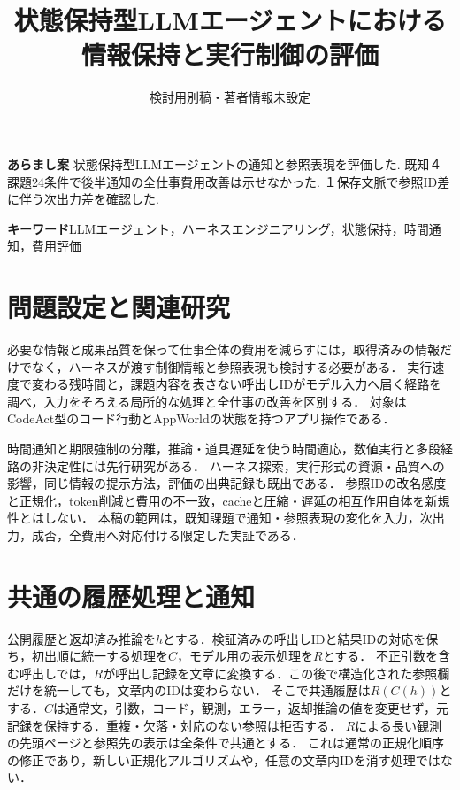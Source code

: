 \documentclass[uplatex,a4paper,twocolumn,10pt]{jsarticle}
\title{状態保持型LLMエージェントにおける\newline 情報保持と実行制御の評価}
\author{検討用別稿・著者情報未設定}
\date{}
\begin{document}
\raggedbottom
\maketitle
\noindent\textbf{あらまし案}\quad
状態保持型LLMエージェントの通知と参照表現を評価した. 既知４課題24条件で後半通知の全仕事費用改善は示せなかった. １保存文脈で参照ID差に伴う次出力差を確認した.

\noindent\textbf{キーワード}\quad LLMエージェント，ハーネスエンジニアリング，状態保持，時間通知，費用評価

\section{問題設定と関連研究}
必要な情報と成果品質を保って仕事全体の費用を減らすには，取得済みの情報だけでなく，ハーネスが渡す制御情報と参照表現も検討する必要がある．
実行速度で変わる残時間と，課題内容を表さない呼出しIDがモデル入力へ届く経路を調べ，入力をそろえる局所的な処理と全仕事の改善を区別する．
対象はCodeAct\cite{codeact}型のコード行動とAppWorld\cite{appworld}の状態を持つアプリ操作である．

時間通知と期限強制の分離\cite{clock}，推論・道具遅延を使う時間適応\cite{timely}，数値実行と多段経路の非決定性\cite{nondeterminism,consistency}には先行研究がある．
ハーネス探索\cite{beyondprompts}，実行形式の資源・品質への影響\cite{localprotocol}，同じ情報の提示方法\cite{delivery}，評価の出典記録\cite{repro}も既出である．
参照IDの改名感度と正規化\cite{canonical}，token削減と費用の不一致\cite{costproxy}，cacheと圧縮・遅延の相互作用\cite{capc,cacheeval}自体を新規性とはしない．
本稿の範囲は，既知課題で通知・参照表現の変化を入力，次出力，成否，全費用へ対応付ける限定した実証である．

\section{共通の履歴処理と通知}
公開履歴と返却済み推論を$h$とする．検証済みの呼出しIDと結果IDの対応を保ち，初出順に統一する処理を$C$，モデル用の表示処理を$R$とする．
不正引数を含む呼出しでは，$R$が呼出し記録を文章に変換する．この後で構造化された参照欄だけを統一しても，文章内のIDは変わらない．
そこで共通履歴は$R(C(h))$とする．$C$は通常文，引数，コード，観測，エラー，返却推論の値を変更せず，元記録を保持する．重複・欠落・対応のない参照は拒否する．
$R$による長い観測の先頭ページと参照先の表示は全条件で共通とする．
これは通常の正規化順序の修正であり，新しい正規化アルゴリズムや，任意の文章内IDを消す処理ではない．
\end{document}
